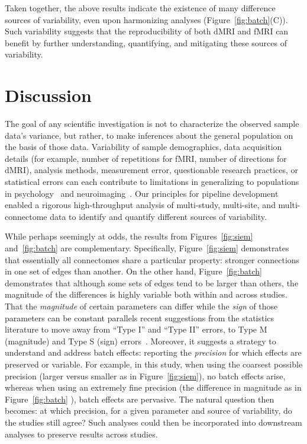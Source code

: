 \documentclass[11pt]{article}
\begin{document}
\begin{multicols}{2}
Taken together, the above results indicate the existence of many difference sources of variability, even upon harmonizing analyses (Figure~\ref{fig:batch}(C)). Such variability suggests that the reproducibility of both dMRI and fMRI can benefit by further understanding, quantifying,  and mitigating these sources of variability.




\section{Discussion}


The goal of any scientific investigation is not to characterize the observed sample data’s variance, but rather, to make inferences about the general population on the basis of those data.  
Variability of sample demographics, data acquisition details (for example, number of repetitions for fMRI, number of directions for dMRI), analysis methods, measurement error, questionable research practices, or statistical errors can each contribute to limitations in generalizing to populations in psychology~\cite{Button2013} and neuroimaging~\cite{Costafreda2009}.
Our principles for pipeline development enabled a rigorous high-throughput analysis of multi-study, multi-site, and multi-connectome data to identify and quantify different sources of variability.

While perhaps seemingly at odds, the results from Figures~\ref{fig:siem} and~\ref{fig:batch} are complementary.  Specifically, Figure~\ref{fig:siem} demonstrates that essentially all connectomes share a particular property: stronger connections in one set of edges than another. On the other hand, Figure~\ref{fig:batch} demonstrates that although some sets of edges tend to be larger than others, the {magnitude} of the differences is highly variable both within and across studies. That the \emph{magnitude} of certain parameters can differ while the \emph{sign} of those parameters can be constant parallels recent suggestions from the statistics literature to move away from ``Type I'' and ``Type II'' errors, to Type M (magnitude) and Type  S (sign) errors~\cite{gelman14a}. Moreover, it suggests a strategy to understand and address batch effects: reporting the \emph{precision} for which effects are preserved or variable.  For example, in this study, when using the coarsest possible precision (larger versus smaller as in Figure~\ref{fig:siem}), no batch effects arise, whereas when using an extremely fine precision (the difference in magnitude as in Figure~\ref{fig:batch} ), batch effects are pervasive. The natural question then becomes: at which precision, for a given parameter and source of variability, do the studies still agree? Such analyses could then be incorporated into downstream analyses to preserve results across studies. 








\end{multicols}
\end{document}
